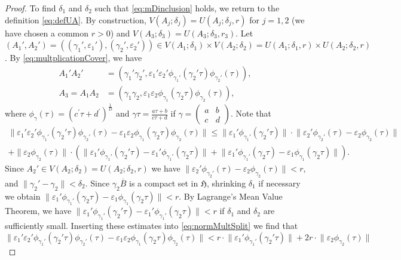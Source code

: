 \documentclass[12pt]{amsart}
\numberwithin{equation}{section}
\theoremstyle{plain}
\theoremstyle{definition}
\theoremstyle{remark}
\newcommand\tbtmat[4]{\left(\begin{smallmatrix}{#1} & {#2} \\ {#3} & {#4}\end{smallmatrix}\right)}
\newcommand\uhp{\mathfrak{H}}
\begin{document}
\begin{appendix}
\begin{proof}
To find $\delta_1$ and $\delta_2$ such that \eqref{eq:mDinclusion} holds, we return to the definition \eqref{eq:defUA}. By construction, $V(A_j;\delta_j)=U(A_j;\delta_j,r)$ for $j=1,2$ (we have chosen a common $r>0$) and $V(A_3;\delta_3)=U(A_3;\delta_3,r_3)$. Let $(A_1',A_2')=((\gamma_1',\varepsilon_1'),(\gamma_2',\varepsilon_2'))\in V(A_1;\delta_1)\times V(A_2;\delta_2)=U(A_1;\delta_1,r)\times U(A_2;\delta_2,r)$. By \eqref{eq:multplicationCover}, we have
\begin{align*}
A_1'A_2'&= (\gamma_1'\gamma_2',\varepsilon_1'\varepsilon_2'\phi_{\gamma_1'}(\gamma_2'\tau)\phi_{\gamma_2'}(\tau)),\\
A_3=A_1A_2  &= (\gamma_1\gamma_2,\varepsilon_1\varepsilon_2\phi_{\gamma_1}(\gamma_2\tau)\phi_{\gamma_2}(\tau)),
\end{align*}
where $\phi_\gamma(\tau)=(c^\prime\tau+d^\prime)^{\frac{1}{D}}$ and $\gamma\tau=\frac{a\tau+b}{c\tau+d}$ if $\gamma=\tbtmat{a}{b}{c}{d}$. Note that
\begin{multline}
\label{eq:normMultSplit}
\lVert\varepsilon_1'\varepsilon_2'\phi_{\gamma_1'}(\gamma_2'\tau)\phi_{\gamma_2'}(\tau)-\varepsilon_1\varepsilon_2\phi_{\gamma_1}(\gamma_2\tau)\phi_{\gamma_2}(\tau)\rVert
\leq\lVert\varepsilon_1'\phi_{\gamma_1'}(\gamma_2'\tau)\rVert\cdot\lVert\varepsilon_2'\phi_{\gamma_2'}(\tau)-\varepsilon_2\phi_{\gamma_2}(\tau)\rVert\\
+\lVert\varepsilon_2\phi_{\gamma_2}(\tau)\rVert\cdot\left(\lVert\varepsilon_1'\phi_{\gamma_1'}(\gamma_2'\tau)-\varepsilon_1'\phi_{\gamma_1'}(\gamma_2\tau)\rVert+\lVert\varepsilon_1'\phi_{\gamma_1'}(\gamma_2\tau)-\varepsilon_1\phi_{\gamma_1}(\gamma_2\tau)\rVert\right).
\end{multline}
Since $A_2'\in V(A_2;\delta_2)=U(A_2;\delta_2,r)$ we have $\lVert\varepsilon_2'\phi_{\gamma_2'}(\tau)-\varepsilon_2\phi_{\gamma_2}(\tau)\rVert<r$, and $\lVert\gamma_2'-\gamma_2\rVert<\delta_2$. Since $\gamma_2\overline{B}$ is a compact set in $\uhp$, shrinking $\delta_1$ if necessary we obtain $\lVert\varepsilon_1'\phi_{\gamma_1'}(\gamma_2\tau)-\varepsilon_1\phi_{\gamma_1}(\gamma_2\tau)\rVert<r$. By Lagrange's Mean Value Theorem, we have $\lVert\varepsilon_1'\phi_{\gamma_1'}(\gamma_2'\tau)-\varepsilon_1'\phi_{\gamma_1'}(\gamma_2\tau)\rVert<r$ if $\delta_1$ and $\delta_2$ are sufficiently small. Inserting these estimates into \eqref{eq:normMultSplit} we find that
\begin{equation*}
\lVert\varepsilon_1'\varepsilon_2'\phi_{\gamma_1'}(\gamma_2'\tau)\phi_{\gamma_2'}(\tau)-\varepsilon_1\varepsilon_2\phi_{\gamma_1}(\gamma_2\tau)\phi_{\gamma_2}(\tau)\rVert< r\cdot\lVert\varepsilon_1'\phi_{\gamma_1'}(\gamma_2'\tau)\rVert+2r\cdot\lVert\varepsilon_2\phi_{\gamma_2}(\tau)\rVert

\end{equation*}
\end{proof}
\end{appendix}
\end{document}
